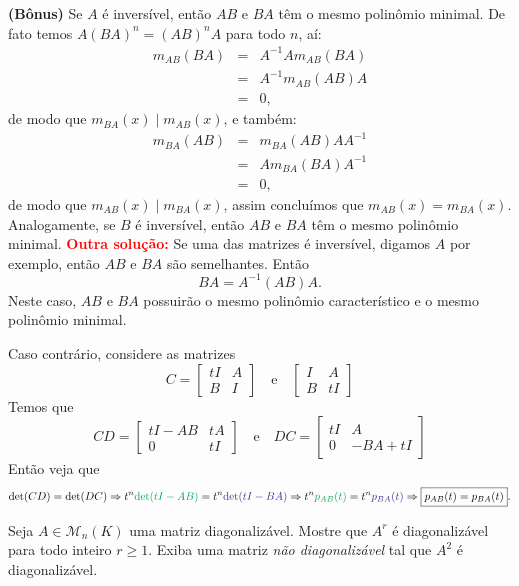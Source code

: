 \documentclass[11pt,a4paper]{article}
\begin{document}
{{\task[\pers{d}] \textbf{(Bônus)} Se $A$ é inversível, então $AB$ e $BA$ têm o mesmo polinômio minimal. De fato temos $A(BA)^n=(AB)^nA$ para todo $n$, aí:
\[
\begin{array}{rcl}
m_{AB}(BA)&=&A^{-1}Am_{AB}(BA)\\&=&A^{-1}m_{AB}(AB)A\\&=&0,
\end{array}
\]
de modo que $m_{BA}(x)\mid m_{AB}(x)$, e também:
\[
\begin{array}{rcl}
m_{BA}(AB)&=&m_{BA}(AB)AA^{-1}\\&=&Am_{BA}(BA)A^{-1}\\&=&0,
\end{array}
\]
de modo que $m_{AB}(x)\mid m_{BA}(x)$, assim concluímos que $m_{AB}(x)=m_{BA}(x)$. Analogamente, se $B$ é inversível, então $AB$ e $BA$ têm o mesmo polinômio minimal.
}
\textbf{\textcolor{Red}{Outra solução:}} Se uma das matrizes é inversível, digamos $A$ por exemplo, então $AB$ e $BA$ são semelhantes. Então \[BA = A^{-1}(AB)A.\]
Neste caso, $AB$ e $BA$ possuirão o mesmo polinômio característico e o mesmo polinômio minimal.

Caso contrário, considere as matrizes
\[
C = \begin{bmatrix}
tI & A \\ B & I
\end{bmatrix} \quad \mbox{e} \quad \begin{bmatrix}
I & A \\ B & tI
\end{bmatrix}
\]
Temos que
\[
CD =  \begin{bmatrix}
tI-AB & tA \\ 0 & tI
\end{bmatrix}   \quad \mbox{e} \quad DC = \begin{bmatrix}
tI & A \\ 0 & -BA + tI
\end{bmatrix} 
\]
Então veja que
\[
\det(CD) = \det(DC) \Rightarrow t^n \textcolor{Green}{\det(tI - AB)} = t^n \textcolor{Blue}{\det(tI-BA)} \Rightarrow t^n \textcolor{Green}{p_{AB}(t)} = t^n \textcolor{Blue}{p_{BA}(t)} \Rightarrow \boxed{p_{AB}(t) = p_{BA}(t)}.
\]
}

 Seja $A \in \mathcal{M}_n(K)$ uma matriz diagonalizável. Mostre que $A^r$ é diagonalizável para todo inteiro $r \ge 1.$ Exiba uma matriz \emph{não diagonalizável} tal que $A^2$ é diagonalizável.
\end{document}
